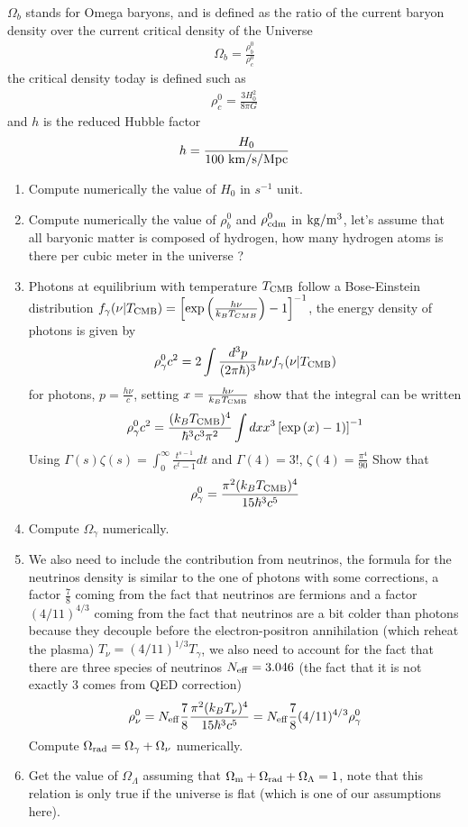 \documentclass[a4paper, 11pt]{article}
\def\ba{\begin{eqnarray}}
\def\ea{\end{eqnarray}}
\begin{document}
$\Omega_{b}$ stands for Omega baryons, and is defined as the ratio of the current baryon density  over the current critical density of the Universe 
\ba
\Omega_{b} = \frac{\rho^{0}_{b}}{\rho^{0}_{c}}  \nonumber
\ea
the critical density today is defined such as
\ba
\rho^{0}_{c} = \frac{3H^{2}_{0}}{8\pi G}
\ea 
and $h$ is the reduced Hubble factor 
\ba
h = \frac{H_{0}}{100 \ \rm km/s/Mpc}
\ea
\begin{enumerate}
\item Compute numerically the value of $H_{0}$ in $s^{-1}$ unit.
\item Compute numerically the value of $\rho^{0}_{b}$ and $\rho^{0}_{\rm cdm}$ in $\rm{kg}/m^{3}$, let's assume that all baryonic matter is composed of hydrogen, how many hydrogen atoms is there per cubic meter in the universe ?
\item Photons at equilibrium with temperature $T_{\rm CMB}$ follow a Bose-Einstein distribution $f_{\gamma}(\nu | T_{\rm CMB}) = \left[\exp \left(\frac{h\nu}{k_{B}T_{CMB}} \right)-1\right]^{-1}$, the energy density of photons is given by
\ba
\rho^{0}_{\gamma} c^{2}= 2 \int \frac{d^{3}p}{(2\pi \hbar)^{3}} h\nu f_{\gamma}(\nu | T_{\rm CMB}) 
\ea
for photons, $p = \frac{h\nu}{ c}$, setting $x = \frac{h\nu}{k_{B}T_{\rm CMB}}$ show that the integral can be written
\ba
\rho^{0}_{\gamma} c^{2}= \frac{ (k_{B}T_{\rm CMB})^{4}}{\hbar^{3}c^{3}\pi^{2}} \int dx x^{3}  \left[\exp \left(x)-1\right)\right]^{-1}
\ea
Using $\Gamma(s) \zeta(s)  = \int_{0}^{\infty} \frac{t^{s-1}}{e^{t}-1}dt$
and  $\Gamma(4) = 3!$, $\zeta(4) = \frac{\pi^{4}}{90}$
Show that
\ba
\rho^{0}_{\gamma}  =  \frac{\pi^{2} (k_{B}T_{\rm CMB})^{4}}{15 \hbar^{3}c^{5}}
\ea
\item Compute $\Omega_{\gamma}$  numerically.
\item We also need to include the contribution from neutrinos, the formula for the neutrinos density is similar to the one of photons with some corrections, a factor $\frac{7}{8}$ coming from the fact that neutrinos are fermions and a factor $(4/11)^{4/3}$ coming from the fact that neutrinos are a bit colder than photons because they decouple before the electron-positron annihilation (which reheat the plasma) $T_{\nu} = (4/11)^{1/3} T_{\gamma}$, we also need to account for the fact that there are three species of neutrinos $N_{\rm eff} =3.046$ (the fact that it is not exactly 3 comes from QED correction)
\ba
\rho^{0}_{\nu}  =  N_{\rm eff}  \frac{7}{8} \frac{\pi^{2} (k_{B}T_{\nu})^{4}}{15 \hbar^{3}c^{5}} = N_{\rm eff}  \frac{7}{8}  (4/11)^{4/3} \rho^{0}_{\gamma}
\ea
Compute $\Omega_{\rm rad} = \Omega_{\gamma} + \Omega_{\nu}$ numerically.
\item Get the value of $\Omega_{\Lambda}$ assuming that  $\Omega_{\rm m} + \Omega_{\rm rad} + \Omega_{\Lambda} = 1$, note that this relation is only true if the universe is flat (which is one of our assumptions here).  

\end{enumerate}
\end{document}
